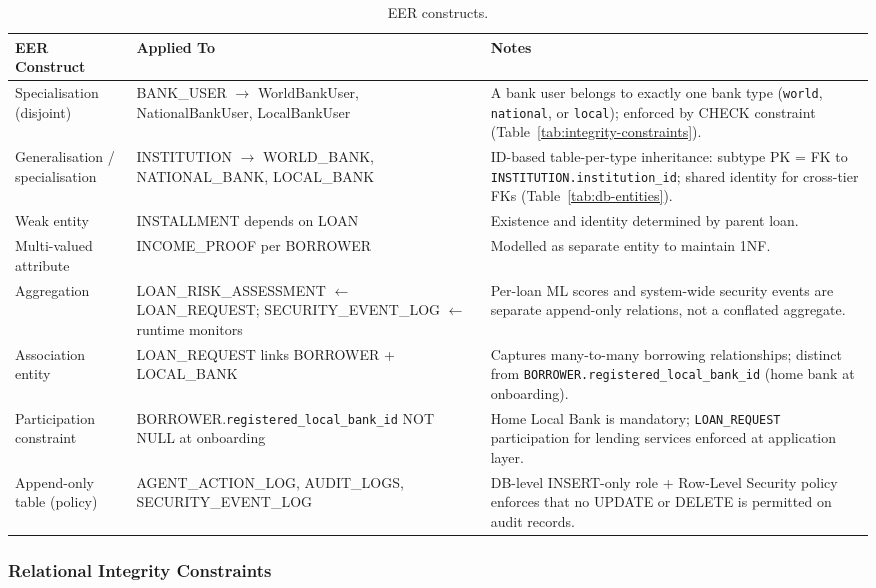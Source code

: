 \begin{table}[H]
\centering
\caption[EER constructs]{EER constructs.}
\label{tab:eer-constructs}
\begin{tabular}{p{3.5cm}p{3.5cm}p{6.5cm}}
\toprule
\tableheadcolor
\textbf{EER Construct} & \textbf{Applied To} & \textbf{Notes} \\
\midrule
Specialisation (disjoint) & BANK\_USER $\to$ WorldBankUser, NationalBankUser, LocalBankUser & A bank user belongs to exactly one bank type (\texttt{world}, \texttt{national}, or \texttt{local}); enforced by CHECK constraint (Table~\ref{tab:integrity-constraints}). \\
Generalisation / specialisation & INSTITUTION $\to$ WORLD\_BANK, NATIONAL\_BANK, LOCAL\_BANK & ID-based table-per-type inheritance: subtype PK = FK to \texttt{INSTITUTION.institution\_id}; shared identity for cross-tier FKs (Table~\ref{tab:db-entities}). \\
Weak entity & INSTALLMENT depends on LOAN & Existence and identity determined by parent loan. \\
Multi-valued attribute & INCOME\_PROOF per BORROWER & Modelled as separate entity to maintain 1NF. \\
Aggregation & LOAN\_RISK\_ASSESSMENT $\leftarrow$ LOAN\_REQUEST; SECURITY\_EVENT\_LOG $\leftarrow$ runtime monitors & Per-loan ML scores and system-wide security events are separate append-only relations, not a conflated aggregate. \\
Association entity & LOAN\_REQUEST links BORROWER + LOCAL\_BANK & Captures many-to-many borrowing relationships; distinct from \texttt{BORROWER.registered\_local\_bank\_id} (home bank at onboarding). \\
Participation constraint & BORROWER.\texttt{registered\_local\_bank\_id} NOT NULL at onboarding & Home Local Bank is mandatory; \texttt{LOAN\_REQUEST} participation for lending services enforced at application layer. \\
Append-only table (policy) & AGENT\_ACTION\_LOG, AUDIT\_LOGS, SECURITY\_EVENT\_LOG & DB-level INSERT-only role + Row-Level Security policy enforces that no UPDATE or DELETE is permitted on audit records. \\
\bottomrule
\end{tabular}
\end{table}

\subsubsection{Relational Integrity Constraints}
\label{sec:integrity-constraints}

